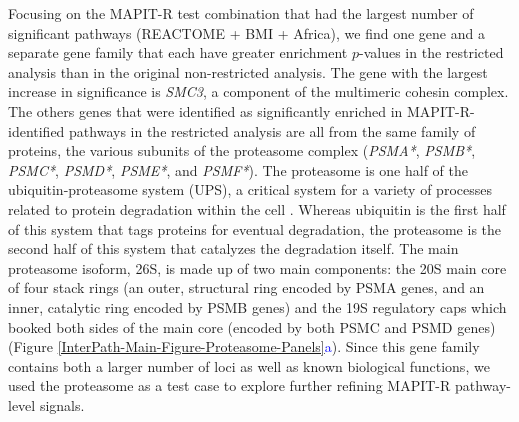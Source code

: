 \documentclass[12pt,a4paper]{article}
\begin{document}
Focusing on the MAPIT-R test combination that had the largest number of significant pathways (REACTOME + BMI + Africa), we find one gene and a separate gene family that each have greater enrichment $p$-values in the restricted analysis than in the original non-restricted analysis. The gene with the largest increase in significance is {\emph{SMC3}}, a component of the multimeric cohesin complex. The others genes that were identified as significantly enriched in MAPIT-R-identified pathways in the restricted analysis are all from the same family of proteins, the various subunits of the proteasome complex ({\emph{PSMA*}}, {\emph{PSMB*}}, {\emph{PSMC*}}, {\emph{PSMD*}}, {\emph{PSME*}}, and {\emph{PSMF*}}). The proteasome is one half of the ubiquitin-proteasome system (UPS), a critical system for a variety of processes related to protein degradation within the cell \citep{Voges1999,Livneh2016,Collins2017}. Whereas ubiquitin is the first half of this system that tags proteins for eventual degradation, the proteasome is the second half of this system that catalyzes the degradation itself. The main proteasome isoform, 26S, is made up of two main components: the 20S main core of four stack rings (an outer, structural ring encoded by PSMA genes, and an inner, catalytic ring encoded by PSMB genes) and the 19S regulatory caps which booked both sides of the main core (encoded by both PSMC and PSMD genes) (Figure \ref{InterPath-Main-Figure-Proteasome-Panels}\textcolor{blue}{a}). Since this gene family contains both a larger number of loci as well as known biological functions, we used the proteasome as a test case to explore further refining MAPIT-R pathway-level signals.
\end{document}
